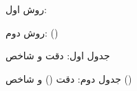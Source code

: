 \documentclass{article}
\begin{document}
روش اول: 

روش دوم: ()

جدول اول: دقت  و شاخص 

جدول دوم: دقت () و شاخص ()
\end{document}
